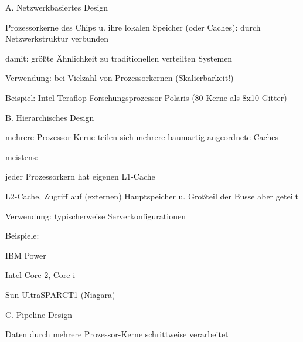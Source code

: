 \documentclass[a4paper]{article}
\begin{document}
\begin{multicols}{3}
    \begin{itemize*}
        \item
        A. Netzwerkbasiertes Design
        \begin{itemize*}
            \item Prozessorkerne des Chips u. ihre lokalen Speicher (oder Caches): durch Netzwerkstruktur verbunden
            \item damit: größte Ähnlichkeit zu traditionellen verteilten Systemen
            \item Verwendung: bei Vielzahl von Prozessorkernen (Skalierbarkeit!)
            \item Beispiel: Intel Teraflop-Forschungsprozessor Polaris (80 Kerne als 8x10-Gitter)
        \end{itemize*}
        \item
        B. Hierarchisches Design
        \begin{itemize*}
            \item mehrere Prozessor-Kerne teilen sich mehrere baumartig angeordnete Caches
            \item meistens: \begin{itemize*} \item   jeder Prozessorkern hat eigenen L1-Cache \item   L2-Cache, Zugriff auf (externen) Hauptspeicher u. Großteil der   Busse aber geteilt \end{itemize*}
            \item Verwendung: typischerweise Serverkonfigurationen
            \item Beispiele: \begin{itemize*} \item   IBM Power \item   Intel Core 2, Core i \item   Sun UltraSPARCT1 (Niagara) \end{itemize*}
        \end{itemize*}
        \item
        C. Pipeline-Design
        \begin{itemize*}
            \item Daten durch mehrere Prozessor-Kerne schrittweise verarbeitet

\end{itemize*}
\end{itemize*}
\end{multicols}
\end{document}
